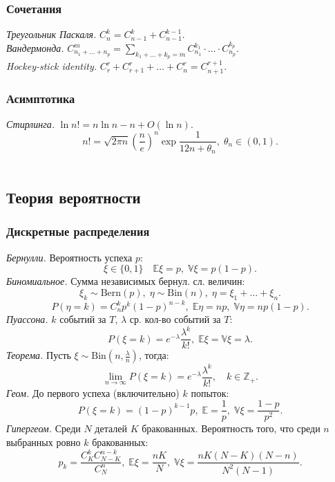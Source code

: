 \subsubsection{Сочетания}
\textit{Треугольник Паскаля.} $C_n^k=C_{n-1}^k+C_{n-1}^{k-1}$.\\
\textit{Вандермонда.} $C_{n_1+\dots+n_p}^m=\displaystyle\sum_{k_1+\dots+k_p=m}C_{n_1}^{k_1}\cdot\ldots\cdot C_{n_p}^{k_p}$.\\
\textit{Hockey-stick identity.} $C_r^r+C_{r+1}^r+\dots+C_n^r=C_{n+1}^{r+1}$.\\
\subsubsection{Асимптотика}
\textit{Стирлинга.} $\ln n!=n\ln n-n+O(\ln n).$
$$n!=\sqrt{2\pi n}\left(\dfrac{n}{e}\right)^n\exp\dfrac{1}{12n+\theta_n},\;\theta_n\in(0,1).$$\\

\subsection{Теория вероятности}
\subsubsection{Дискретные распределения}
\textit{Бернулли.} Вероятность успеха $p$:
$$\xi\in\{0,1\}\quad \mathbb{E}\xi=p,\;\mathbb{V}\xi=p(1-p).$$
\textit{Биномиальное.} Сумма независимых бернул. сл. величин:
$$\xi_k\sim\text{Bern}(p),\;\eta\sim\text{Bin}(n),\;\eta=\xi_1+\dots+\xi_n.$$
$$P(\eta=k)=C_n^kp^k(1-p)^{n-k},\;\mathbb{E}\eta=np,\;\mathbb{V}\eta=np(1-p).$$
\textit{Пуассона.} $k$ событий за $T$, $\lambda$ ср. кол-во событий за $T$:
$$P(\xi=k)=e^{-\lambda}\dfrac{\lambda^k}{k!},\;\mathbb{E}\xi=\mathbb{V}\xi=\lambda.$$
\textit{Теорема.} Пусть $\xi\sim\text{Bin}(n,\frac{\lambda}{n})$, тогда:
$$\displaystyle\lim_{n\to\infty}P(\xi=k)=e^{-\lambda}\dfrac{\lambda^k}{k!},\quad k\in\mathbb{Z}_+.$$
\textit{Геом.} До первого успеха (включительно) $k$ попыток:
$$P(\xi=k)=(1-p)^{k-1}p,\;\mathbb{E}=\dfrac{1}{p},\;\mathbb{V}\xi=\dfrac{1-p}{p^2}.$$
\textit{Гипергеом.} Среди $N$ деталей $K$ бракованных. Вероятность того, что среди $n$ выбранных ровно $k$ бракованных:
$$p_k=\dfrac{C_K^kC_{N-K}^{n-k}}{C_N^n},\;\mathbb{E}\xi=\dfrac{nK}{N},\;\mathbb{V}\xi=\dfrac{nK(N-K)(N-n)}{N^2(N-1)}.$$